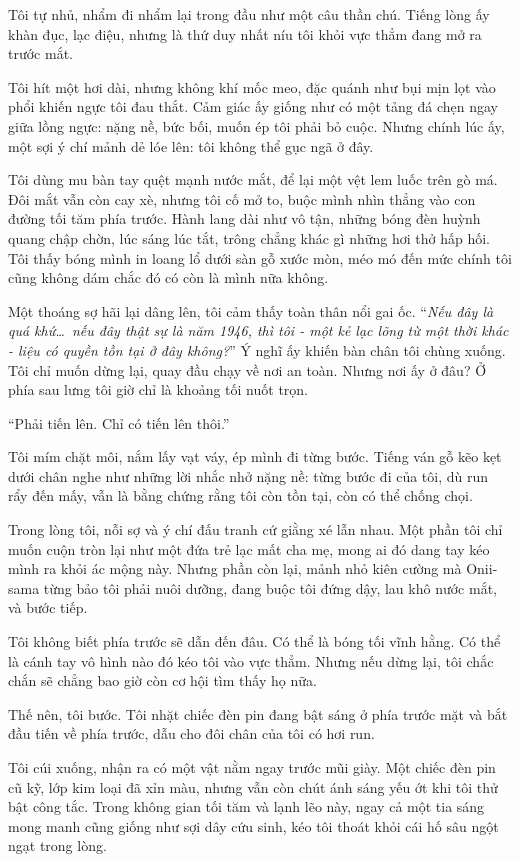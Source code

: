 \documentclass[../main.tex]{subfiles}
\begin{document}
Tôi tự nhủ, nhẩm đi nhẩm lại trong đầu như một câu thần chú. Tiếng lòng ấy khàn đục, lạc điệu, nhưng là thứ duy nhất níu tôi khỏi vực thẳm đang mở ra trước mắt.

Tôi hít một hơi dài, nhưng không khí mốc meo, đặc quánh như bụi mịn lọt vào phổi khiến ngực tôi đau thắt. Cảm giác ấy giống như có một tảng đá chẹn ngay giữa lồng ngực: nặng nề, bức bối, muốn ép tôi phải bỏ cuộc. Nhưng chính lúc ấy, một sợi ý chí mảnh dẻ lóe lên: tôi không thể gục ngã ở đây.

Tôi dùng mu bàn tay quệt mạnh nước mắt, để lại một vệt lem luốc trên gò má. Đôi mắt vẫn còn cay xè, nhưng tôi cố mở to, buộc mình nhìn thẳng vào con đường tối tăm phía trước. Hành lang dài như vô tận, những bóng đèn huỳnh quang chập chờn, lúc sáng lúc tắt, trông chẳng khác gì những hơi thở hấp hối. Tôi thấy bóng mình in loang lổ dưới sàn gỗ xước mòn, méo mó đến mức chính tôi cũng không dám chắc đó có còn là mình nữa không.

Một thoáng sợ hãi lại dâng lên, tôi cảm thấy toàn thân nổi gai ốc. ``\textit{Nếu đây là quá khứ\dots\ nếu đây thật sự là năm 1946, thì tôi - một kẻ lạc lõng từ một thời khác - liệu có quyền tồn tại ở đây không?}'' Ý nghĩ ấy khiến bàn chân tôi chùng xuống. Tôi chỉ muốn dừng lại, quay đầu chạy về nơi an toàn. Nhưng nơi ấy ở đâu? Ở phía sau lưng tôi giờ chỉ là khoảng tối nuốt trọn.

``Phải tiến lên. Chỉ có tiến lên thôi.''

Tôi mím chặt môi, nắm lấy vạt váy, ép mình đi từng bước. Tiếng ván gỗ kẽo kẹt dưới chân nghe như những lời nhắc nhở nặng nề: từng bước đi của tôi, dù run rẩy đến mấy, vẫn là bằng chứng rằng tôi còn tồn tại, còn có thể chống chọi.

Trong lòng tôi, nỗi sợ và ý chí đấu tranh cứ giằng xé lẫn nhau. Một phần tôi chỉ muốn cuộn tròn lại như một đứa trẻ lạc mất cha mẹ, mong ai đó dang tay kéo mình ra khỏi ác mộng này. Nhưng phần còn lại, mảnh nhỏ kiên cường mà Onii-sama từng bảo tôi phải nuôi dưỡng, đang buộc tôi đứng dậy, lau khô nước mắt, và bước tiếp.

Tôi không biết phía trước sẽ dẫn đến đâu. Có thể là bóng tối vĩnh hằng. Có thể là cánh tay vô hình nào đó kéo tôi vào vực thẳm. Nhưng nếu dừng lại, tôi chắc chắn sẽ chẳng bao giờ còn cơ hội tìm thấy họ nữa.

Thế nên, tôi bước. Tôi nhặt chiếc đèn pin đang bật sáng ở phía trước mặt và bắt đầu tiến về phía trước, dẫu cho đôi chân của tôi có hơi run.

Tôi cúi xuống, nhận ra có một vật nằm ngay trước mũi giày. Một chiếc đèn pin cũ kỹ, lớp kim loại đã xỉn màu, nhưng vẫn còn chút ánh sáng yếu ớt khi tôi thử bật công tắc. Trong không gian tối tăm và lạnh lẽo này, ngay cả một tia sáng mong manh cũng giống như sợi dây cứu sinh, kéo tôi thoát khỏi cái hố sâu ngột ngạt trong lòng.
\end{document}
